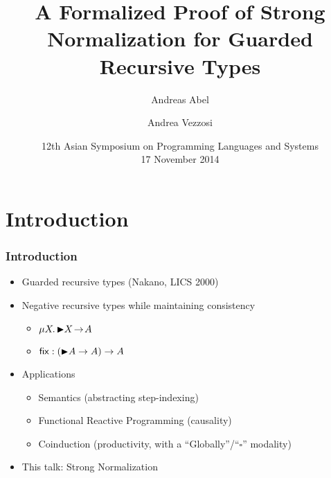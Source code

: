 \documentclass[t]{beamer}
\title[SN Guarded Types]{%
  A Formalized Proof of Strong Normalization for Guarded Recursive Types}
\author[Abel Vezzosi]{
  Andreas Abel
  \and Andrea Vezzosi
}
\institute[Chalmers/GU] %
{
  Department of Computer Science and Engineering\\
  Chalmers and Gothenburg University, Sweden \\[1ex]
}
\date[APLAS 2014] %
{ 12th Asian Symposium on Programming Languages and Systems \\
  17 November 2014}
\newcommand{\muT}[2]{\mu {#1} \hspace{-0.1em} . \,  {#2}}
\begin{document}
\newcommand{\lat}[1]{\later \! {#1}}
\newcommand{\arr}{\!\to\!}
\newcommand{\lam}[2]{\lambda {#1} \hspace{-0.1em} . {#2}}
\maketitle



\section{Introduction}


\begin{frame}%
  \frametitle{Introduction}
  \begin{itemize}
  \item Guarded recursive types (Nakano, LICS 2000)
  \item Negative recursive types while maintaining consistency
    \begin{itemize}
      \item $\muT X {\lat X \arr  A}$
      \item $\tfix : (\lat A \to A) \to A$
    \end{itemize}
  \item Applications
    \begin{itemize}
      \item Semantics (abstracting step-indexing)
      \item Functional Reactive Programming (causality)
      \item Coinduction (productivity, with a ``Globally''/``$\square$'' modality)
    \end{itemize}
  \vspace{10pt}
  \item \Large This talk: Strong Normalization
  \end{itemize}
\end{frame}
\end{document}
